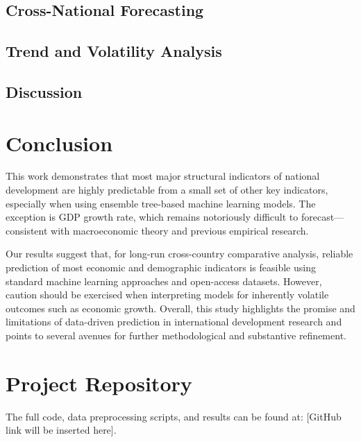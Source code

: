\documentclass[12pt]{article}
\begin{document}
\subsection{Cross-National Forecasting}

\subsection{Trend and Volatility Analysis}

\subsection{Discussion}

\section{Conclusion}

This work demonstrates that most major structural indicators of national development are highly predictable from a small set of other key indicators, especially when using ensemble tree-based machine learning models. The exception is GDP growth rate, which remains notoriously difficult to forecast—consistent with macroeconomic theory and previous empirical research.

Our results suggest that, for long-run cross-country comparative analysis, reliable prediction of most economic and demographic indicators is feasible using standard machine learning approaches and open-access datasets. However, caution should be exercised when interpreting models for inherently volatile outcomes such as economic growth. Overall, this study highlights the promise and limitations of data-driven prediction in international development research and points to several avenues for further methodological and substantive refinement.


\section*{Project Repository}
The full code, data preprocessing scripts, and results can be found at: [GitHub link will be inserted here].





\end{document}
